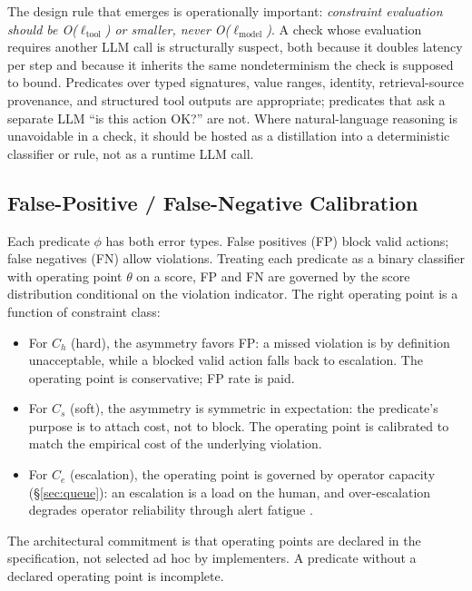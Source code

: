 \documentclass[11pt,a4paper]{article}
\theoremstyle{remark}
\begin{document}
The design rule that emerges is operationally important: \emph{constraint evaluation should be O($\ell_{\text{tool}}$) or smaller, never O($\ell_{\text{model}}$)}. A check whose evaluation requires another LLM call is structurally suspect, both because it doubles latency per step and because it inherits the same nondeterminism the check is supposed to bound. Predicates over typed signatures, value ranges, identity, retrieval-source provenance, and structured tool outputs are appropriate; predicates that ask a separate LLM ``is this action OK?'' are not. Where natural-language reasoning is unavoidable in a check, it should be hosted as a distillation into a deterministic classifier or rule, not as a runtime LLM call.

\subsection{False-Positive / False-Negative Calibration}\label{sec:calib}

Each predicate $\phi$ has both error types. False positives (FP) block valid actions; false negatives (FN) allow violations. Treating each predicate as a binary classifier with operating point $\theta$ on a score, FP and FN are governed by the score distribution conditional on the violation indicator. The right operating point is a function of constraint class:

\begin{itemize}[leftmargin=2em,topsep=0.3em,itemsep=0.3em]
\item For $C_h$ (hard), the asymmetry favors FP: a missed violation is by definition unacceptable, while a blocked valid action falls back to escalation. The operating point is conservative; FP rate is paid.
\item For $C_s$ (soft), the asymmetry is symmetric in expectation: the predicate's purpose is to attach cost, not to block. The operating point is calibrated to match the empirical cost of the underlying violation.
\item For $C_e$ (escalation), the operating point is governed by operator capacity (\S\ref{sec:queue}): an escalation is a load on the human, and over-escalation degrades operator reliability through alert fatigue \cite{anaby2024alertfatigue,parasuraman1997vigilance}.
\end{itemize}

The architectural commitment is that operating points are declared in the specification, not selected ad hoc by implementers. A predicate without a declared operating point is incomplete.
\end{document}
